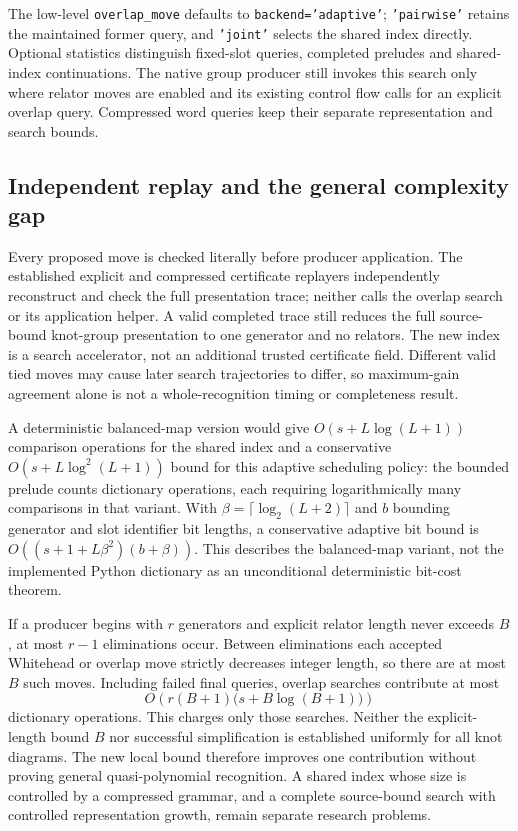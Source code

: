 The low-level \texttt{overlap\_move} defaults to \texttt{backend='adaptive'};
\texttt{'pairwise'} retains the maintained former query, and \texttt{'joint'}
selects the shared index directly. Optional statistics distinguish fixed-slot
queries, completed preludes and shared-index continuations. The native group
producer still invokes this search only where relator moves are enabled and
its existing control flow calls for an explicit overlap query. Compressed
word queries keep their separate representation and search bounds.

\subsection{Independent replay and the general complexity gap}

Every proposed move is checked literally before producer application. The
established explicit and compressed certificate replayers independently
reconstruct and check the full presentation trace; neither calls the overlap
search or its application helper. A valid completed trace still reduces the
full source-bound knot-group presentation to one generator and no relators.
The new index is a search accelerator, not an additional trusted certificate
field. Different valid tied moves may cause later search trajectories to
differ, so maximum-gain agreement alone is not a whole-recognition timing
or completeness result.

A deterministic balanced-map version would give
$O(s+L\log(L+1))$ comparison operations for the shared index and a conservative
$O(s+L\log^2(L+1))$ bound for this adaptive scheduling policy: the bounded
prelude counts dictionary operations, each requiring logarithmically many
comparisons in that variant. With $\beta=\lceil\log_2(L+2)\rceil$ and
$b$ bounding generator and slot identifier bit lengths, a conservative
adaptive bit bound is $O((s+1+L\beta^2)(b+\beta))$. This describes the
balanced-map variant, not the implemented Python dictionary as an
unconditional deterministic bit-cost theorem.

If a producer begins with $r$ generators and explicit relator length never
exceeds $B$, at most $r-1$ eliminations occur. Between eliminations each
accepted Whitehead or overlap move strictly decreases integer length, so
there are at most $B$ such moves. Including failed final queries, overlap
searches contribute at most
\[
 O\!\left(r(B+1)\bigl(s+B\log(B+1)\bigr)\right)
\]
dictionary operations. This charges only those searches. Neither the
explicit-length bound $B$ nor successful simplification is established
uniformly for all knot diagrams. The new local bound therefore improves
one contribution without proving general quasi-polynomial recognition.
A shared index whose size is controlled by a compressed grammar, and a
complete source-bound search with controlled representation growth, remain
separate research problems.

